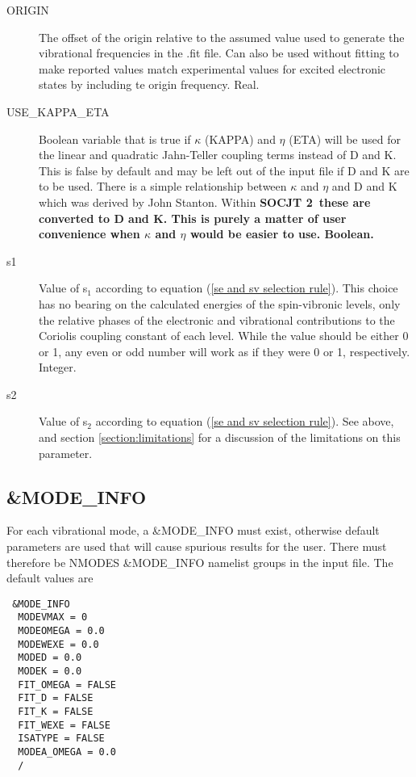 \documentclass{article}
\newcommand{\socjttwo}{\bf{SOCJT 2}}
\begin{document}
\begin{description}
  \item[ORIGIN] The offset of the origin relative to the assumed value used to generate the vibrational frequencies in the .fit file. Can also be used without fitting to make reported values match experimental values for excited electronic states by including te origin frequency. Real.
  
  
  \item[USE\_KAPPA\_ETA] Boolean variable that is true if $\kappa$ (KAPPA) and 
  $\eta$ (ETA) will be used for the linear and quadratic Jahn-Teller coupling
  terms instead of D and K. This is false by default and may be left out of the
  input file if D and K are to be used. There is a simple relationship between
  $\kappa$ and $\eta$ and D and K which was derived by John Stanton. Within
  \socjttwo\ these are converted to D and K. This is purely a matter of user convenience
  when $\kappa$ and $\eta$ would be easier to use. Boolean.

\item[s1] Value of s$_1$ according to equation (\ref{se and sv
    selection rule}). This choice has no bearing on the calculated
  energies of the spin-vibronic levels, only the relative phases of
  the electronic and vibrational contributions to the Coriolis
  coupling constant of each level. While the value should be either 0
  or 1, any even or odd number will work as if they were 0 or 1,
  respectively. Integer. 

\item[s2] Value of s$_2$ according to equation (\ref{se and sv
    selection rule}). See above, and section \ref{section:limitations}
  for a discussion of the limitations on this parameter.

\end{description}

\subsection{\&MODE\_INFO}

For each vibrational mode, a \&MODE\_INFO must exist, otherwise
default parameters are used that will cause spurious results for the
user. There must therefore be NMODES \&MODE\_INFO namelist groups in
the input file. The default values are

\begin{verbatim}
 &MODE_INFO
  MODEVMAX = 0
  MODEOMEGA = 0.0
  MODEWEXE = 0.0
  MODED = 0.0
  MODEK = 0.0
  FIT_OMEGA = FALSE
  FIT_D = FALSE
  FIT_K = FALSE
  FIT_WEXE = FALSE
  ISATYPE = FALSE
  MODEA_OMEGA = 0.0
  /
\end{verbatim}
\end{document}
